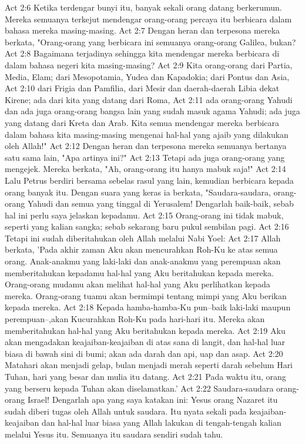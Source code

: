 Act 2:6  Ketika terdengar bunyi itu, banyak sekali orang datang berkerumun. Mereka semuanya terkejut mendengar orang-orang percaya itu berbicara dalam bahasa mereka masing-masing.
Act 2:7  Dengan heran dan terpesona mereka berkata, "Orang-orang yang berbicara ini semuanya orang-orang Galilea, bukan?
Act 2:8  Bagaimana terjadinya sehingga kita mendengar mereka berbicara di dalam bahasa negeri kita masing-masing?
Act 2:9  Kita orang-orang dari Partia, Media, Elam; dari Mesopotamia, Yudea dan Kapadokia; dari Pontus dan Asia,
Act 2:10  dari Frigia dan Pamfilia, dari Mesir dan daerah-daerah Libia dekat Kirene; ada dari kita yang datang dari Roma,
Act 2:11  ada orang-orang Yahudi dan ada juga orang-orang bangsa lain yang sudah masuk agama Yahudi; ada juga yang datang dari Kreta dan Arab. Kita semua mendengar mereka berbicara dalam bahasa kita masing-masing mengenai hal-hal yang ajaib yang dilakukan oleh Allah!"
Act 2:12  Dengan heran dan terpesona mereka semuanya bertanya satu sama lain, "Apa artinya ini?"
Act 2:13  Tetapi ada juga orang-orang yang mengejek. Mereka berkata, "Ah, orang-orang itu hanya mabuk saja!"
Act 2:14  Lalu Petrus berdiri bersama sebelas rasul yang lain, kemudian berbicara kepada orang banyak itu. Dengan suara yang keras ia berkata, "Saudara-saudara, orang-orang Yahudi dan semua yang tinggal di Yerusalem! Dengarlah baik-baik, sebab hal ini perlu saya jelaskan kepadamu.
Act 2:15  Orang-orang ini tidak mabuk, seperti yang kalian sangka; sebab sekarang baru pukul sembilan pagi.
Act 2:16  Tetapi ini sudah diberitahukan oleh Allah melalui Nabi Yoel:
Act 2:17  Allah berkata, 'Pada akhir zaman Aku akan mencurahkan Roh-Ku ke atas semua orang. Anak-anakmu yang laki-laki dan anak-anakmu yang perempuan akan memberitahukan kepadamu hal-hal yang Aku beritahukan kepada mereka. Orang-orang mudamu akan melihat hal-hal yang Aku perlihatkan kepada mereka. Orang-orang tuamu akan bermimpi tentang mimpi yang Aku berikan kepada mereka.
Act 2:18  Kepada hamba-hamba-Ku pun--baik laki-laki maupun perempuan--,akan Kucurahkan Roh-Ku pada hari-hari itu. Mereka akan memberitahukan hal-hal yang Aku beritahukan kepada mereka.
Act 2:19  Aku akan mengadakan keajaiban-keajaiban di atas sana di langit, dan hal-hal luar biasa di bawah sini di bumi; akan ada darah dan api, uap dan asap.
Act 2:20  Matahari akan menjadi gelap, bulan menjadi merah seperti darah sebelum Hari Tuhan, hari yang besar dan mulia itu datang.
Act 2:21  Pada waktu itu, orang yang berseru kepada Tuhan akan diselamatkan.'
Act 2:22  Saudara-saudara orang-orang Israel! Dengarlah apa yang saya katakan ini: Yesus orang Nazaret itu sudah diberi tugas oleh Allah untuk saudara. Itu nyata sekali pada keajaiban-keajaiban dan hal-hal luar biasa yang Allah lakukan di tengah-tengah kalian melalui Yesus itu. Semuanya itu saudara sendiri sudah tahu.
